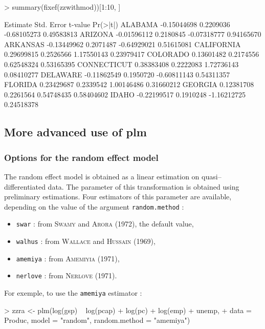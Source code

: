 \documentclass[a4paper]{article}
\begin{document}
\begin{Schunk}
\begin{Sinput}
> summary(fixef(zzwithmod))[1:10, ]
\end{Sinput}
\begin{Soutput}
               Estimate Std. Error     t-value   Pr(>|t|)
ALABAMA     -0.15044698  0.2209036 -0.68105273 0.49583813
ARIZONA     -0.01596112  0.2180845 -0.07318777 0.94165670
ARKANSAS    -0.13449962  0.2071487 -0.64929021 0.51615081
CALIFORNIA   0.29699815  0.2526566  1.17550143 0.23979417
COLORADO     0.13601482  0.2174556  0.62548324 0.53165395
CONNECTICUT  0.38383408  0.2222083  1.72736143 0.08410277
DELAWARE    -0.11862549  0.1950720 -0.60811143 0.54311357
FLORIDA      0.23429687  0.2339542  1.00146486 0.31660212
GEORGIA      0.12381708  0.2261564  0.54748435 0.58404602
IDAHO       -0.22199517  0.1910248 -1.16212725 0.24518378
\end{Soutput}
\end{Schunk}


\subsection{More advanced use of plm}


\subsubsection{Options for the random effect model}

The random effect model is obtained as a linear estimation on
quasi--differentiated  data. The parameter of this transformation is
obtained using preliminary estimations. Four estimators of this
parameter are available, depending on the value of the argument \texttt{random.method}  :

\begin{itemize}
\item \texttt{swar} : from \textsc{Swamy} and \textsc{Arora}
  (1972), the default value,
\item \texttt{walhus} : from \textsc{Wallace} and \textsc{Hussain} (1969),
\item \texttt{amemiya} : from \textsc{Amemiyia} (1971),
\item \texttt{nerlove} : from \textsc{Nerlove} (1971).
\end{itemize}

For exemple, to use the \texttt{amemiya} estimator :

\begin{Schunk}
\begin{Sinput}
> zzra <- plm(log(gsp) ~ log(pcap) + log(pc) + log(emp) + unemp, 
+     data = Produc, model = "random", random.method = "amemiya")
\end{Sinput}
\end{Schunk}
\end{document}
